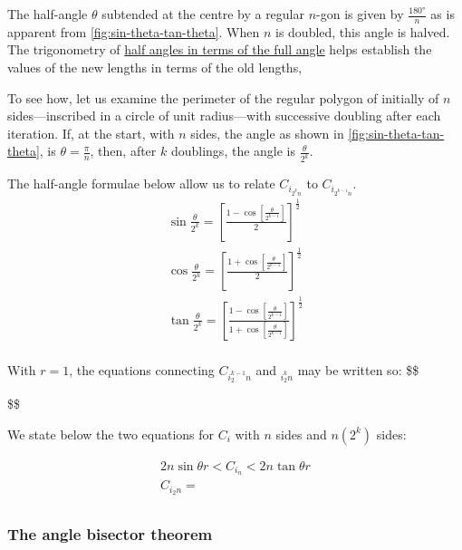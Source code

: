 \documentclass[
  a4paper,
]{article}
\begin{document}
The half-angle \(\theta\) subtended at the centre by a regular \(n\)-gon
is given by \(\frac{180°}{n}\) as is apparent from
\cref{fig:sin-theta-tan-theta}. When \(n\) is doubled, this angle is
halved. The trigonometry of
\href{https://math.libretexts.org/Bookshelves/Algebra/Algebra_and_Trigonometry_1e_(OpenStax)/09:_Trigonometric_Identities_and_Equations/9.03:_Double-Angle_Half-Angle_and_Reduction_Formulas}{half
angles in terms of the full angle} helps establish the values of the new
lengths in terms of the old lengths,

To see how, let us examine the perimeter of the regular polygon of
initially of \(n\) sides---inscribed in a circle of unit radius---with
successive doubling after each iteration. If, at the start, with \(n\)
sides, the angle as shown in \cref{fig:sin-theta-tan-theta}, is
\(\theta = \frac{\pi}{n}\), then, after \(k\) doublings, the angle is
\(\frac{\theta}{2^k}\).

The half-angle formulae below allow us to relate \(C_{i_{2^{k}n}}\) to
\(C_{i_{2^{k-1}n}}\). \[\begin{aligned}
\sin\frac{\theta}{2^k} = %
\left[\frac{1-\cos\left[\frac{\theta}{2^{k-1}}\right]}{2}\right]^{\frac{1}{2}}\\
%
\cos\frac{\theta}{2^k} = %
\left[\frac{1+\cos\left[\frac{\theta}{2^{k-1}}\right]}{2}\right]^{\frac{1}{2}}\\
%
\tan\frac{\theta}{2^k} = %
\left[\frac{1-\cos\left[\frac{\theta}{2^{k-1}}\right]}{1+\cos\left[\frac{\theta}{2^{k-1}}\right]}\right]^{\frac{1}{2}}\\
\end{aligned}
\]

With \(r=1\), the equations connecting \(C_{i_2^{k-1}n}\) and
\(_{i_2^{k}n}\) may be written so: \$\$

\$\$

We state below the two equations for \(C_i\) with \(n\) sides and
\(n(2^k)\) sides:

\[
\begin{aligned}
2n\sin\theta r < C_{i_{n}} < 2n\tan\theta r \\
C_{i{_2n}} =  \\
\end{aligned}
\]

\subsubsection{The angle bisector
theorem}\label{the-angle-bisector-theorem}
\end{document}
